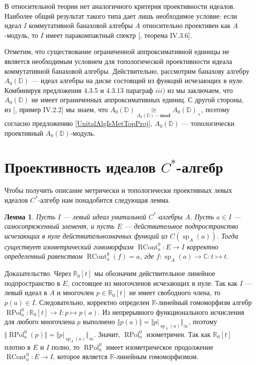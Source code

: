 \documentclass[12pt]{article}
\numberwithin{equation}{subsection}
\theoremstyle{plain}
\newtheorem{lemma}{Лемма}
\newenvironment{proof}{Доказательство.}{}
\newcommand{\isom}[1]{\mathop{\mathbin{\cong}}\limits_{#1}}
\begin{document}
\begin{fulltext}
В относительной теории нет аналогичного критерия проективности идеалов. Наиболее общий результат такого типа дает лишь необходимое условие: если идеал $I$ коммутативной банаховой алгебры $A$ относительно проективен как $A$-модуль, то $I$ имеет паракомпактный спектр [\cite{HelHomolBanTopAlg}, теорема IV.3.6]. 

Отметим, что существование ограниченной аппроксимативной единицы не является необходимым условием для топологической проективности идеала коммутативной банаховой алгебры. Действительно, рассмотрим банахову алгебру  $A_0(\mathbb{D})$ --- идеал алгебры на диске состоящий из функций исчезающих в нуле. Комбинируя предложения 4.3.5 и 4.3.13 параграф $iii)$ из \cite{DalBanAlgAutCont} мы заключаем, что $A_0(\mathbb{D})$ не имеет ограниченных аппроксимативных единиц. С другой стороны, из [\cite{HelBanLocConvAlg}, пример IV.2.2] мы знаем, что $A_0(\mathbb{D})\isom{A_0(\mathbb{D})-\mathbf{mod}} A_0(\mathbb{D})_+$, поэтому согласно предложению \ref{UnitalAlgIsMetTopProj}, $A_0(\mathbb{D})$ --- топологически проективный $A_0(\mathbb{D})$-модуль.


\section{Проективность идеалов $C^*$-алгебр}
\label{ProjectiveIdealsOfCStarAlgebras}

Чтобы получить описание метрически и топологически проективных левых идеалов $C^*$-алгебр нам понадобится следующая лемма.

\begin{lemma}\label{ContFuncCalcOnIdealOfCStarAlg} Пусть $I$ --- левый идеал унитальной $C^*$-алгебры $A$. Пусть $a\in I$ --- самосопряженный элемент, и пусть $E$ --- действительное подпространство исчезающих в нуле действительнозначных функций из $C(\operatorname{sp}_A(a))$. Тогда существует изометрический гомоморфизм $\operatorname{RCont}_a^0:E\to I$ корректно определенный равенством $\operatorname{RCont}_a^0(f)=a$, где $f:\operatorname{sp}_A(a)\to\mathbb{C}:t\mapsto t$.
\end{lemma}
\begin{proof} Через $\mathbb{R}_0[t]$ мы обозначим действительное линейное подпространство в $E$, состоящее из многочленов исчезающих в нуле. Так как $I$ --- левый идеал в $A$ и многочлен $p\in\mathbb{R}_0[t]$ не имеет свободного члена, то $p(a)\in I$. Следовательно, корректно определен $\mathbb{R}$-линейный гомоморфизм алгебр $\operatorname{RPol}_a^0:\mathbb{R}_0[t]\to I:p\mapsto p(a)$. Из непрерывного функционального исчисления для любого многочлена $p$ выполнено $\Vert p(a)\Vert=\Vert p|_{\operatorname{sp}_A(a)}\Vert_\infty$, поэтому $\Vert\operatorname{RPol}_a^0(p)\Vert=\Vert p|_{\operatorname{sp}_A(a)}\Vert_\infty$. Значит, $\operatorname{RPol}_a^0$ изометричен. Так как $\mathbb{R}_0[t]$ плотно в $E$ и $I$ полно, то $\operatorname{RPol}_a^0$ имеет изометрическое продолжение $\operatorname{RCont}_a^0:E\to I$, которое является $\mathbb{R}$-линейным гомоморфизмом. 
\end{proof}


\end{fulltext}
\end{document}
